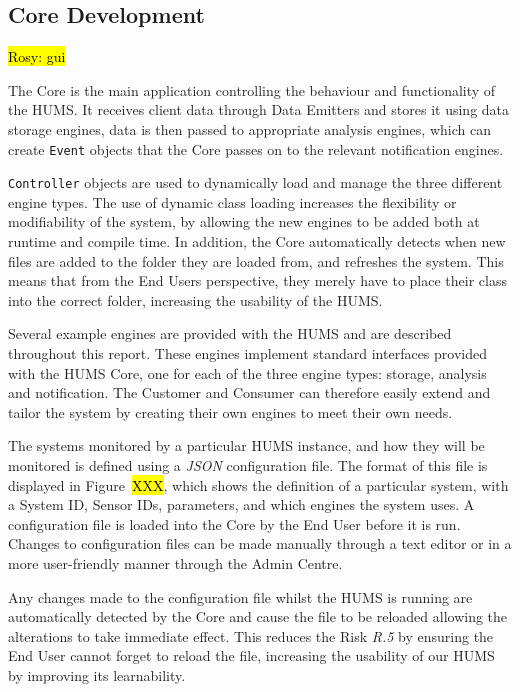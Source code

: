 \documentclass[10pt,a4paper]{article}
\begin{document}
\subsection{Core Development}
\label{sec:core}
\hl{Rosy: gui}

The Core is the main application controlling the behaviour and functionality of the HUMS. It receives client data through Data Emitters and stores it using data storage engines, data is then passed to appropriate analysis engines, which can create \texttt{Event} objects that the Core passes on to the relevant notification engines.

\texttt{Controller} objects are used to dynamically load and manage the three different engine types. The use of dynamic class loading increases the flexibility or modifiability of the system, by allowing the new engines to be added both at runtime and compile time. In addition, the Core automatically detects when new files are added to the folder they are loaded from, and refreshes the system. This means that from the End Users perspective, they merely have to place their class into the correct folder, increasing the usability of the HUMS. 

Several example engines are provided with the HUMS and are described throughout this report. These engines implement standard interfaces provided with the HUMS Core, one for each of the three engine types: storage, analysis and notification. The Customer and Consumer can therefore easily extend and tailor the system by creating their own engines to meet their own needs.

The systems monitored by a particular HUMS instance, and how they will be monitored is defined using a \emph{JSON} configuration file.
The format of this file is displayed in Figure~\hl{XXX}, which shows the definition of a particular system, with a System ID, Sensor IDs, parameters, and which engines the system uses.
A configuration file is loaded into the Core by the End User before it is run. Changes to configuration files can be made manually through a text editor or in a more user-friendly manner through the Admin Centre.

Any changes made to the configuration file whilst the HUMS is running are automatically detected by the Core and cause the file to be reloaded allowing the alterations to take immediate effect. This reduces the Risk \emph{R.5} by ensuring the End User cannot forget to reload the file, increasing the usability of our HUMS by improving its learnability.
\end{document}
